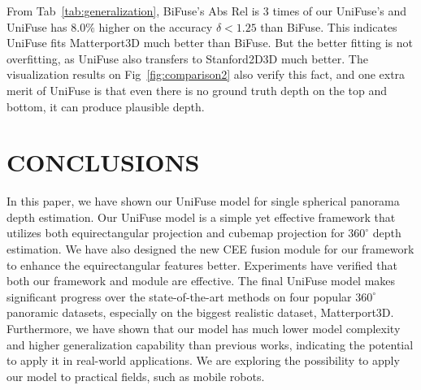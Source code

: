 \documentclass[letterpaper, 10 pt, conference]{ieeeconf}
\begin{document}
From Tab~\ref{tab:generalization}, BiFuse's Abs Rel is 3 times of our UniFuse's and UniFuse has $8.0\%$ higher on the accuracy $\delta<1.25$  than BiFuse. This indicates UniFuse fits Matterport3D much better than BiFuse. But the better fitting is not overfitting, as UniFuse also transfers to Stanford2D3D much better. 
The visualization results on Fig~\ref{fig:comparison2} also verify this fact, and one extra merit of UniFuse is that even there is no ground truth depth on the top and bottom, it can produce plausible depth. 





\begin{table}[t]
\vspace{5pt}
  \centering
\caption{\textbf{Generalization Comparison.}}
\label{tab:generalization}
\vspace{-10pt}
\end{table}


\section{CONCLUSIONS}
In this paper, we have shown our UniFuse model for single spherical panorama depth estimation. Our UniFuse model is a simple yet effective framework that utilizes both equirectangular projection and cubemap projection for $360^{\circ}$ depth estimation. We have also designed the new CEE fusion module for our framework to enhance the equirectangular features better. 
Experiments have verified that both our framework and module are effective. The final UniFuse model makes significant progress over the state-of-the-art methods on four popular $360^{\circ}$ panoramic datasets, especially on the biggest realistic dataset, Matterport3D. 
Furthermore, we have shown that our model has much lower model complexity and higher generalization capability than previous works, indicating the potential to apply it in real-world applications.
We are exploring the possibility to apply our model to practical fields, such as mobile robots. 


{\small


}
\end{document}
